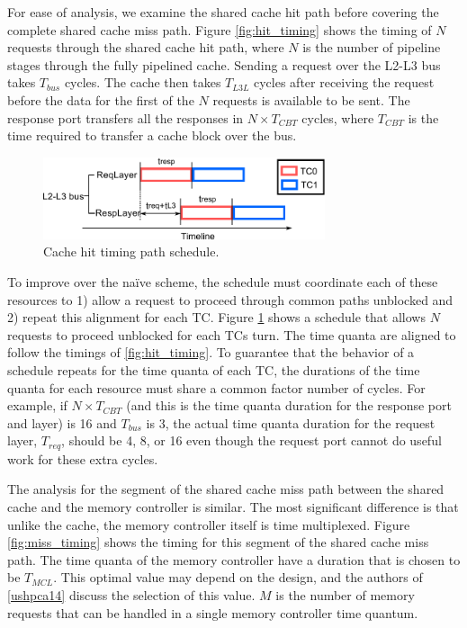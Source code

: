 For ease of analysis, we examine the shared cache hit path before covering the 
complete shared cache miss path. Figure \ref{fig:hit_timing} shows the timing 
of $N$ requests through the shared cache hit path, where $N$ is the number of 
pipeline stages through the fully pipelined cache. Sending a request over the 
L2-L3 bus takes $T_{bus}$ cycles.  The cache then takes $T_{L3L}$ cycles after 
receiving the request before the data for the first of the $N$ requests is 
available to be sent. The response port transfers all the responses in $N\times 
T_{CBT}$ cycles, where $T_{CBT}$ is the time required to transfer a cache block 
over the bus.

\begin{figure}
    \begin{center}
        \includegraphics[width=3.2624in]{figs/hit_schedule.pdf}
        \caption{Cache hit timing path schedule.}
        \label{fig:hit_schedule}
    \end{center}
\end{figure}

To improve over the naïve scheme, the schedule must coordinate each of these 
resources to 1) allow a request to proceed through common paths unblocked and 
2) repeat this alignment for each TC. Figure \ref{fig:hit_schedule} shows a 
schedule that allows $N$ requests to proceed unblocked for each TCs turn. The 
time quanta are aligned to follow the timings of \ref{fig:hit_timing}. To 
guarantee that the behavior of a schedule repeats for the time quanta of each 
TC, the durations of the time quanta for each resource must share a common 
factor number of cycles. For example, if $N \times T_{CBT}$ (and this is the 
time quanta duration for the response port and layer) is 16 and $T_{bus}$ is 3, 
the actual time quanta duration for the request layer, $T_{req}$, should be 4, 
8, or 16 even though the request port cannot do useful work for these extra 
cycles.

The analysis for the segment of the shared cache miss path between the shared 
cache and the memory controller is similar. The most significant difference is 
that unlike the cache, the memory controller itself is time multiplexed. Figure 
\ref{fig:miss_timing} shows the timing for this segment of the shared cache miss path. The 
time quanta of the memory controller have a duration that is chosen to be 
$T_{MCL}$. This optimal value may depend on the design, and
the authors of \ref{ushpca14} discuss the selection of this value. $M$ is the 
number of memory requests that can be handled in a single memory controller 
time quantum.

